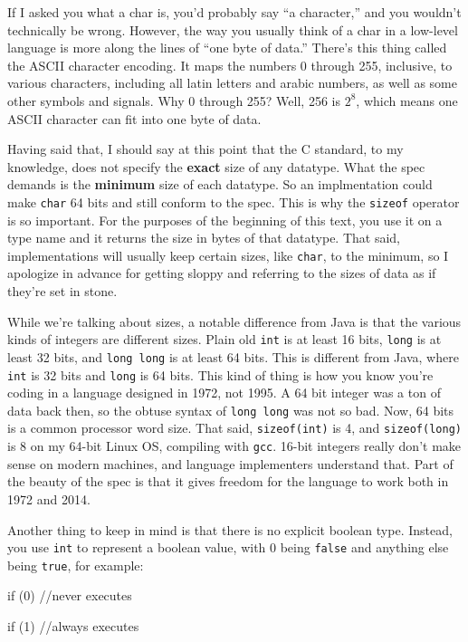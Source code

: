 \documentclass[ebook,11pt,oneside,openany]{memoir}
\newcommand{\cf}[1]{\texttt{#1}}
\begin{document}
If I asked you what a char is, you'd probably say ``a character,'' and you wouldn't technically be wrong. However, the way you usually think of a char in a low-level language is more along the lines of ``one byte of data.'' There's this thing called the ASCII character encoding. It maps the numbers 0 through 255, inclusive, to various characters, including all latin letters and arabic numbers, as well as some other symbols and signals. Why 0 through 255? Well, 256 is $2^8$, which means one ASCII character can fit into one byte of data.

Having said that, I should say at this point that the C standard, to my knowledge, does not specify the \textbf{exact} size of any datatype. What the spec demands is the \textbf{minimum} size of each datatype. So an implmentation could make \cf{char} 64 bits and still conform to the spec. This is why the \cf{sizeof} operator is so important. For the purposes of the beginning of this text, you use it on a type name and it returns the size in bytes of that datatype. That said, implementations will usually keep certain sizes, like \cf{char}, to the minimum, so I apologize in advance for getting sloppy and referring to the sizes of data as if they're set in stone.

While we're talking about sizes, a notable difference from Java is that the various kinds of integers are different sizes. Plain old \cf{int} is at least 16 bits, \cf{long} is at least 32 bits, and \cf{long long} is at least 64 bits. This is different from Java, where \cf{int} is 32 bits and \cf{long} is 64 bits. This kind of thing is how you know you're coding in a language designed in 1972, not 1995. A 64 bit integer was a ton of data back then, so the obtuse syntax of \cf{long long} was not so bad. Now, 64 bits is a common processor word size. That said, \cf{sizeof(int)} is 4, and \cf{sizeof(long)} is 8 on my 64-bit Linux OS, compiling with \cf{gcc}. 16-bit integers really don't make sense on modern machines, and language implementers understand that. Part of the beauty of the spec is that it gives freedom for the language to work both in 1972 and 2014.

Another thing to keep in mind is that there is no explicit boolean type. Instead, you use \texttt{int} to represent a boolean value, with 0 being \texttt{false} and anything else being \texttt{true}, for example:

\begin{code}
if (0) {
  //never executes
}

if (1) {
  //always executes
}
\end{code}
\end{document}
